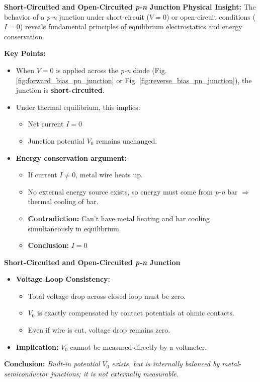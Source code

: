 \begin{frame}{\textbf{Short-Circuited and Open-Circuited \textit{p-n} Junction}}
    \textbf{Physical Insight:} The behavior of a \textit{p-n} junction under short-circuit ($V = 0$) or open-circuit conditions ($I = 0$) reveals fundamental principles of equilibrium electrostatics and energy conservation.

    \vspace{0.7em}
    \textbf{Key Points:}
    \begin{itemize}
        \item When $V = 0$ is applied across the \textit{p-n} diode (Fig. \ref{fig:forward_bias_pn_junction} or Fig. \ref{fig:reverse_bias_pn_junction}), the junction is \textbf{short-circuited}.
        \item Under thermal equilibrium, this implies:
        \begin{itemize}
            \item Net current $I = 0$
            \item Junction potential $V_0$ remains unchanged.
        \end{itemize}

        \item \textbf{Energy conservation argument:}
        \begin{itemize}
            \item If current $I \neq 0$, metal wire heats up.
            \item No external energy source exists, so energy must come from \textit{p-n} bar $\Rightarrow$ thermal cooling of bar.
            \item \textbf{Contradiction:} Can't have metal heating and bar cooling simultaneously in equilibrium.
            \item \textbf{Conclusion:} $I = 0$
        \end{itemize}
	\end{itemize}
\end{frame}

\begin{frame}{\textbf{Short-Circuited and Open-Circuited \textit{p-n} Junction}}
	\begin{itemize}
	\item \textbf{Voltage Loop Consistency:}
	\begin{itemize}
		\item Total voltage drop across closed loop must be zero.
		\item $V_0$ is exactly compensated by contact potentials at ohmic contacts.
		\item Even if wire is cut, voltage drop remains zero.
	\end{itemize}

	\item \textbf{Implication:} $V_0$ cannot be measured directly by a voltmeter.
	\end{itemize}

	\vspace{0.7em}
	\textbf{Conclusion:} \textit{Built-in potential $V_0$ exists, but is internally balanced by metal-semiconductor junctions; it is not externally measurable.}
\end{frame}